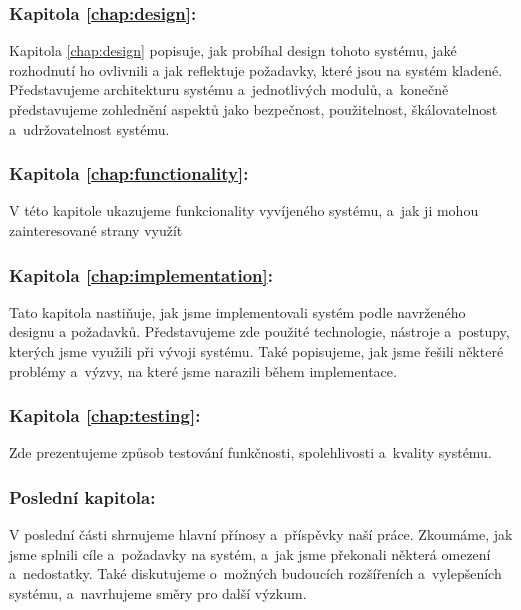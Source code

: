 \subsubsection{Kapitola \ref{chap:design}: }
Kapitola \ref{chap:design} popisuje, jak probíhal design tohoto systému, jaké rozhodnutí ho ovlivnili a jak reflektuje požadavky, které jsou na systém kladené.
Představujeme architekturu systému a~jednotlivých modulů, a~konečně představujeme zohlednění aspektů jako bezpečnost, použitelnost, škálovatelnost a~udržovatelnost systému.

\subsubsection{Kapitola \ref{chap:functionality}: }
V této kapitole ukazujeme funkcionality vyvíjeného systému, a~jak ji mohou zainteresované strany využít

\subsubsection{Kapitola \ref{chap:implementation}: }
Tato kapitola nastiňuje, jak jsme implementovali systém podle navrženého designu a požadavků.
Představujeme zde použité technologie, nástroje a~postupy, kterých jsme využili při vývoji systému.
Také popisujeme, jak jsme řešili některé problémy a~výzvy, na které jsme narazili během implementace.

\subsubsection{Kapitola \ref{chap:testing}: }
Zde prezentujeme způsob testování funkčnosti, spolehlivosti a~kvality systému.

\subsubsection{Poslední kapitola: }
V poslední části shrnujeme hlavní přínosy a~příspěvky naší práce. Zkoumáme, jak jsme splnili cíle a~požadavky na systém, a~jak jsme překonali některá omezení a~nedostatky.
Také diskutujeme o~možných budoucích rozšířeních a~vylepšeních systému, a~navrhujeme směry pro další výzkum.